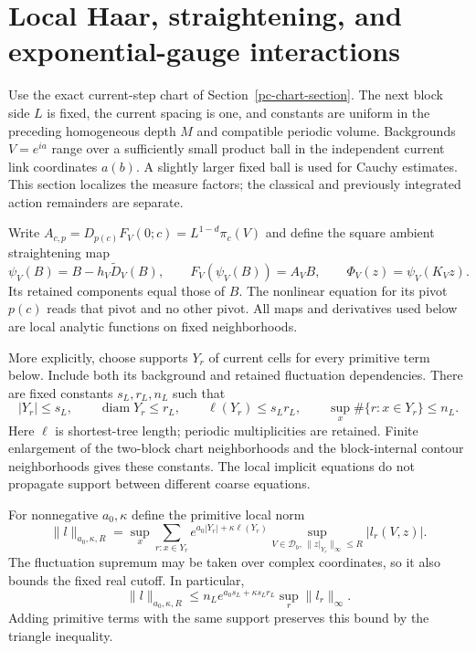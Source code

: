 \section{Local Haar, straightening, and exponential-gauge interactions}
\label{pm-section}

Use the exact current-step chart of Section~\ref{pc-chart-section}.
The next block side $L$ is fixed, the current spacing is one,
and constants are uniform in the preceding homogeneous depth $M$
and compatible periodic volume. Backgrounds $V=e^{ia}$ range
over a sufficiently small product ball in the independent
current link coordinates $a(b)$. A slightly larger fixed ball
is used for Cauchy estimates. This section localizes the measure
factors; the classical and previously integrated action
remainders are separate.

Write $A_{c,p}=D_{p(c)}F_V(0;c)=L^{1-d}\pi_c(V)$ and define
the square ambient straightening map
\begin{equation}\label{pm-ambient-map}
 \psi_V(B)=B-h_V\widetilde D_V(B),\qquad
 F_V(\psi_V(B))=A_VB,\qquad
 \Phi_V(z)=\psi_V(K_Vz).
\end{equation}
Its retained components equal those of $B$. The nonlinear
equation for its pivot $p(c)$ reads that pivot and no other
pivot. All maps and derivatives used below are local analytic
functions on fixed neighborhoods.

More explicitly, choose supports $Y_r$ of current cells for
every primitive term below. Include both its background and
retained fluctuation dependencies. There are fixed constants
$s_L,r_L,n_L$ such that
\begin{equation}\label{pm-support-bounds}
 |Y_r|\le s_L,\qquad \operatorname{diam}Y_r\le r_L,
 \qquad \ell(Y_r)\le s_Lr_L,\qquad
 \sup_x\#\{r:x\in Y_r\}\le n_L.
\end{equation}
Here $\ell$ is shortest-tree length; periodic multiplicities
are retained. Finite enlargement of the two-block chart
neighborhoods and the block-internal contour neighborhoods
gives these constants. The local implicit equations do not
propagate support between different coarse equations.

For nonnegative $a_0,\kappa$ define the primitive local norm
\begin{equation}\label{pm-local-norm}
 \|l\|_{a_0,\kappa,R}
 =\sup_x\sum_{r:x\in Y_r}
 e^{a_0|Y_r|+\kappa\ell(Y_r)}
 \sup_{V\in\mathcal D_b,\,\|z|_{Y_r}\|_\infty\le R}|l_r(V,z)|.
\end{equation}
The fluctuation supremum may be taken over complex coordinates,
so it also bounds the fixed real cutoff. In particular,
\begin{equation}\label{pm-incidence-bound}
 \|l\|_{a_0,\kappa,R}
 \le n_Le^{a_0s_L+\kappa s_Lr_L}\sup_r\|l_r\|_\infty.
\end{equation}
Adding primitive terms with the same support preserves this
bound by the triangle inequality.

